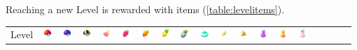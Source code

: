 Reaching a new Level is rewarded with items (\autoref{table:levelitems}).
\begin{table}[t]
  \begin{center}
  \setlength{\tabcolsep}{1pt}
  \footnotesize
  \begin{tabular}{r g c g c g c g c g c g c g c g c g c}
  Level &
  \includegraphics[width=1em]{images/pokeball.png} &
  \includegraphics[width=1em]{images/greatball.png} &
  \includegraphics[width=1em]{images/ultraball.png} &
  \includegraphics[width=1em]{images/nanab.png} &
  \includegraphics[width=1em]{images/razz.png} &
  \includegraphics[width=1em]{images/goldenrazz.png} &
  \includegraphics[width=1em]{images/pinap.png} &
  \includegraphics[width=1em]{images/silverpinap.png} &
  \includegraphics[width=1em]{images/incense.png} &
  \includegraphics[width=1em]{images/revive.png} &
  \includegraphics[width=1em]{images/maxrevive.png} &
  \includegraphics[width=1em]{images/Potion.png} &
  \includegraphics[width=1em]{images/Super_Potion.png} &
  \includegraphics[width=1em]{images/Hyper_Potion.png} &

\end{tabular}
\end{center}
\end{table}

